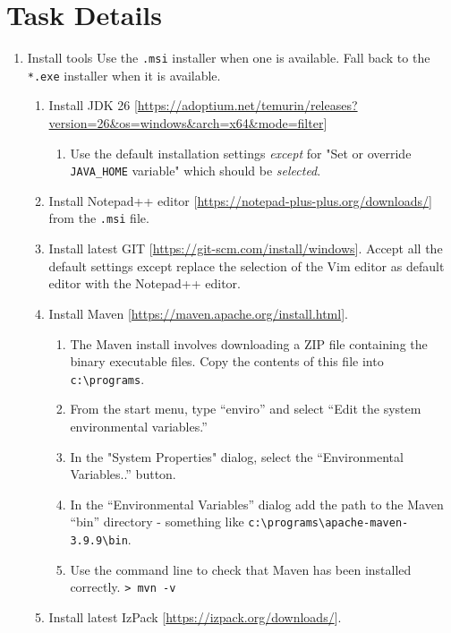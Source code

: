 \documentclass{article}
\begin{document}
\section{Task Details}
\begin{enumerate}
    \item Install tools
    Use the \verb|.msi| installer when one is available.  Fall back to the \verb|*.exe| installer when it is available.
    \begin{enumerate}
        \item Install JDK 26 [\url{https://adoptium.net/temurin/releases?version=26&os=windows&arch=x64&mode=filter}]
        \begin{enumerate}
            \item Use the default installation settings \emph{except} for "Set or override \verb|JAVA_HOME| variable" which should be \emph{selected}.
        \end{enumerate}
        \item Install Notepad++ editor [\url{https://notepad-plus-plus.org/downloads/}] from the \verb|.msi| file.
        \item Install latest GIT [\url{https://git-scm.com/install/windows}].  Accept all the default settings except replace the selection of the Vim editor as default editor with the Notepad++ editor.
        \item Install Maven [\url{https://maven.apache.org/install.html}].
        \begin{enumerate}
            \item The Maven install involves downloading a ZIP file containing the binary executable files.  Copy the contents of this file into \verb|c:\programs|.  
            \item From the start menu, type ``enviro'' and select ``Edit the system environmental variables.''
            \item In the "System Properties" dialog, select the ``Environmental Variables..'' button.
            \item In the ``Environmental Variables'' dialog add the path to the Maven ``bin'' directory - something like \verb|c:\programs\apache-maven-3.9.9\bin|.
            \item Use the command line to check that Maven has been installed correctly. \verb|> mvn -v|
        \end{enumerate}
        \item Install latest IzPack [\url{https://izpack.org/downloads/}].
        \begin{enumerate}

\end{enumerate}
\end{enumerate}
\end{enumerate}
\end{document}
